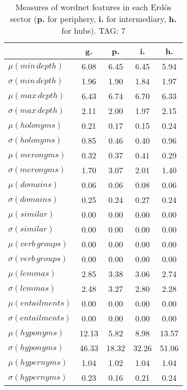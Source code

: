 \begin{table}[h!]
\begin{center}
\begin{tabular}{| l | c | c | c | c |}\hline
 & g. & p. & i. & h. \\\hline
$\mu(min\,depth)$ & 6.08  & 6.45  & 6.45  & 5.94 \\\hline
$\sigma(min\,depth)$ & 1.96  & 1.90  & 1.84  & 1.97 \\\hline
$\mu(max\,depth)$ & 6.43  & 6.74  & 6.70  & 6.33 \\\hline
$\sigma(max\,depth)$ & 2.11  & 2.00  & 1.97  & 2.15 \\\hline
$\mu(holonyms)$ & 0.21  & 0.17  & 0.15  & 0.24 \\\hline
$\sigma(holonyms)$ & 0.85  & 0.46  & 0.40  & 0.96 \\\hline
$\mu(meronyms)$ & 0.32  & 0.37  & 0.41  & 0.29 \\\hline
$\sigma(meronyms)$ & 1.70  & 3.07  & 2.01  & 1.40 \\\hline
$\mu(domains)$ & 0.06  & 0.06  & 0.08  & 0.06 \\\hline
$\sigma(domains)$ & 0.25  & 0.24  & 0.27  & 0.24 \\\hline
$\mu(similar)$ & 0.00  & 0.00  & 0.00  & 0.00 \\\hline
$\sigma(similar)$ & 0.00  & 0.00  & 0.00  & 0.00 \\\hline
$\mu(verb\,groups)$ & 0.00  & 0.00  & 0.00  & 0.00 \\\hline
$\sigma(verb\,groups)$ & 0.00  & 0.00  & 0.00  & 0.00 \\\hline
$\mu(lemmas)$ & 2.85  & 3.38  & 3.06  & 2.74 \\\hline
$\sigma(lemmas)$ & 2.48  & 3.27  & 2.80  & 2.28 \\\hline
$\mu(entailments)$ & 0.00  & 0.00  & 0.00  & 0.00 \\\hline
$\sigma(entailments)$ & 0.00  & 0.00  & 0.00  & 0.00 \\\hline
$\mu(hyponyms)$ & 12.13  & 5.82  & 8.98  & 13.57 \\\hline
$\sigma(hyponyms)$ & 46.33  & 18.32  & 32.26  & 51.06 \\\hline
$\mu(hypernyms)$ & 1.04  & 1.02  & 1.04  & 1.04 \\\hline
$\sigma(hypernyms)$ & 0.23  & 0.16  & 0.21  & 0.24 \\\hline
\end{tabular}
\caption{Measures of wordnet features in each Erd\"os sector ({{\bf p.}} for periphery, {{\bf i.}} for intermediary, {{\bf h.}} for hubs). TAG: 7}
\end{center}
\end{table}